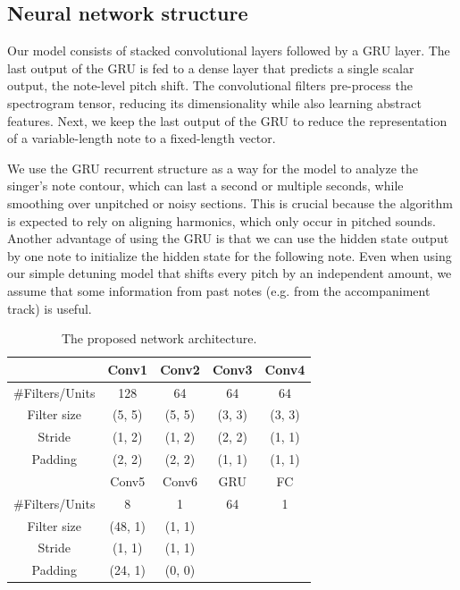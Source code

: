 \subsection{Neural network structure}
Our model consists of stacked convolutional layers followed by a GRU layer. The last output of the GRU is fed to a dense layer that predicts a single scalar output, the note-level pitch shift. The convolutional filters pre-process the spectrogram tensor, reducing its dimensionality while also learning abstract features. Next, we keep the last output of the GRU to reduce the representation of a variable-length note to a fixed-length vector.

We use the GRU recurrent structure as a way for the model to analyze the singer's note contour, which can last a second or multiple seconds, while smoothing over unpitched or noisy sections. This is crucial because the algorithm is expected to rely on aligning harmonics, which only occur in pitched sounds. Another advantage of using the GRU is that we can use the hidden state output by one note to initialize the hidden state for the following note. Even when using our simple detuning model that shifts every pitch by an independent amount, we assume that some information from past notes (e.g. from the accompaniment track) is useful.

\begin{table}[t]
  \begin{center}
    \caption{The proposed network architecture.}
    \begin{tabular}{|c||c|c|c|c|}
    \hline
      & Conv1 & Conv2 & Conv3 & Conv4 \\
      \hline
      \#Filters/Units & 128 & 64 & 64 & 64 \\
      Filter size & (5, 5) & (5, 5) & (3, 3) & (3, 3) \\
      Stride & (1, 2) & (1, 2) & (2, 2) & (1, 1) \\
      Padding & (2, 2) & (2, 2) & (1, 1) & (1, 1) \\
      \hline
      & Conv5 & Conv6 & GRU & FC \\
      \hline
      \#Filters/Units & 8 & 1 & 64 & 1 \\
      Filter size & (48, 1) & (1, 1) & & \\
      Stride & (1, 1) & (1, 1) & & \\
      Padding & (24, 1) & (0, 0) & & \\
      \hline
    \end{tabular}
    \vspace{-.1in}
    \label{tab:network}
  \end{center}
\end{table}

